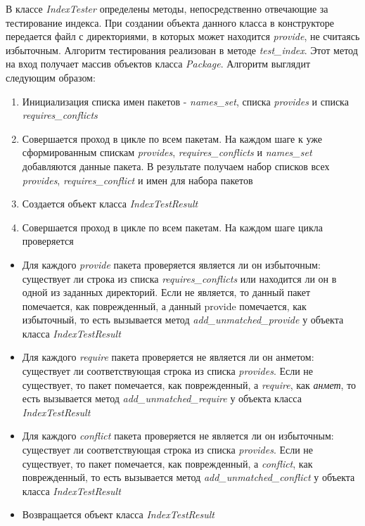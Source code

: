 В классе \textit{IndexTester} определены методы, непосредственно отвечающие за тестирование
индекса. При создании объекта данного класса в конструкторе передается файл с директориями,
в которых может находится \textit{provide}, не считаясь избыточным. 
Алгоритм тестирования реализован в методе \textit{test\_index}. Этот метод на вход
получает массив объектов класса \textit{Package}. Алгоритм выглядит следующим образом:
\begin{enumerate}
\item{Инициализация списка имен пакетов - \textit{names\_set}, списка \textit{provides} и 
списка \textit{requires\_conflicts}}
\item{Совершается проход в цикле по всем пакетам. На каждом шаге 
к уже сформированным спискам \textit{provides}, \textit{requires\_conflicts} и \textit{names\_set} 
добавляются данные пакета. В результате получаем набор списков всех \textit{provides}, 
\textit{requires\_conflict} и имен для набора пакетов}
\item{Создается объект класса \textit{IndexTestResult}}
\item{Совершается проход в цикле по всем пакетам. На каждом шаге цикла проверяется}
\end{enumerate}
\begin{itemize}
\item{Для каждого \textit{provide} пакета проверяется является ли он избыточным: существует ли
строка из списка \textit{requires\_conflicts} или находится ли он в одной из заданных директорий.
Если не является, то данный пакет помечается, как поврежденный, а данный provide помечается,
как избыточный, то есть вызывается метод \emph{add\_unmatched\_provide} у объекта класса \textit{IndexTestResult}}
\item{Для каждого \textit{require} пакета проверяется не является ли он анметом: существует ли
соответствующая строка из списка \textit{provides}. Если не существует, то пакет помечается, как 
поврежденный, а \textit{require}, как \textit{анмет}, то есть вызывается метод \textit{add\_unmatched\_require}
у объекта класса \textit{IndexTestResult}}
\item{Для каждого \textit{conflict} пакета проверяется не является ли он избыточным: существует ли
соответствующая строка из списка \textit{provides}. Если не существует, то пакет помечается, как 
поврежденный, а \textit{conflict}, как поврежденный, то есть вызывается метод \textit{add\_unmatched\_conflict}
у объекта класса \textit{IndexTestResult}}

\item{Возвращается объект класса \textit{IndexTestResult}}
\end{itemize}
